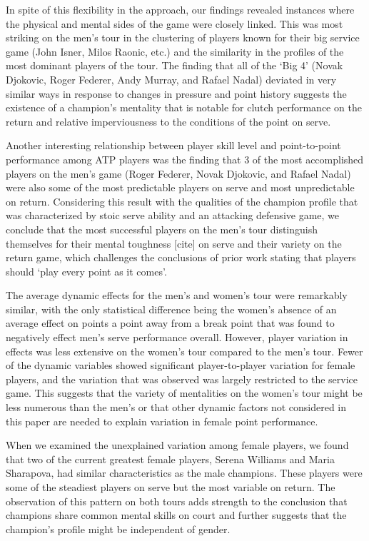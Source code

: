 \documentclass{Latex/svjour3}
\begin{document}
In spite of this flexibility in the approach, our findings revealed instances
where the physical and mental sides of the game were closely linked. This was
most striking on the men's tour in the clustering of players known for their big
service game (John Isner, Milos Raonic, etc.) and the similarity in the profiles
of the most dominant players of the tour. The finding that all of the `Big 4'
(Novak Djokovic, Roger Federer, Andy Murray, and Rafael Nadal) deviated in very
similar ways in response to changes in pressure and point history suggests the
existence of a champion's mentality that is notable for clutch performance on
the return and relative imperviousness to the conditions of the point on serve.

Another interesting relationship between player skill level and point-to-point
performance among ATP players was the finding that 3 of the most accomplished
players on the men's game (Roger Federer, Novak Djokovic, and Rafael Nadal) were
also some of the most predictable players on serve and most unpredictable on
return. Considering this result with the qualities of the champion profile that
was characterized by stoic serve ability and an attacking defensive game, we
conclude that the most successful players on the men's tour distinguish
themselves for their mental toughness [cite] on serve and their variety on the
return game, which challenges the conclusions of prior work stating that players
should `play every point as it comes'\cite{klaassen2001points}.

The average dynamic effects for the men's and women's tour were remarkably
similar, with the only statistical difference being the women's absence of an
average effect on points a point away from a break point that was found to
negatively effect men's serve performance overall. However, player variation in
effects was less extensive on the women's tour compared to the men's tour. Fewer
of the dynamic variables showed significant player-to-player variation for
female players, and the variation that was observed was largely restricted to
the service game. This suggests that the variety of mentalities on the women's
tour might be less numerous than the men's or that other dynamic factors not
considered in this paper are needed to explain variation in female point
performance.

When we examined the unexplained variation among female players, we found that
two of the current greatest female players, Serena Williams and Maria Sharapova,
had similar characteristics as the male champions. These players were some of
the steadiest players on serve but the most variable on return. The observation
of this pattern on both tours adds strength to the conclusion that champions
share common mental skills on court and further suggests that the champion's
profile might be independent of gender.
\end{document}

